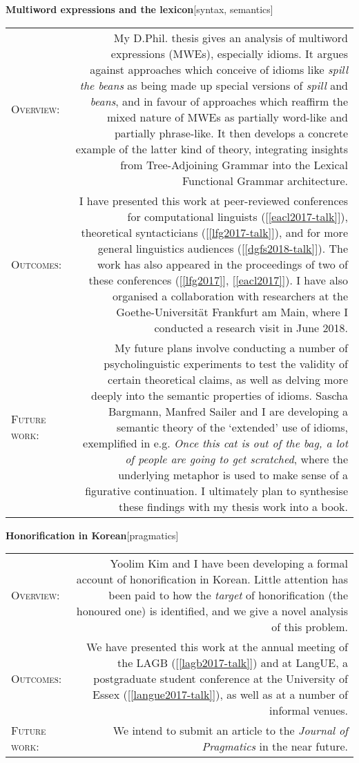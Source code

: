 \documentclass[11pt,a4paper,twoside]{article}
\makeatletter
\newlength{\rulelength}%
\newcommand{\REx}[2]{%
\vspace*{0.1\baselineskip}%
{\large\textbf{#1}\hfill\textnormal{[#2]}}%
\vspace*{0.5\baselineskip}%
}
\newenvironment{cvsection}{%
  \setlength{\extrarowheight}{0.70ex}
  \begin{longtable}[l]{@{} L R @{}}
}{%
  \end{longtable}
}
\newcommand{\sref}[1]{[\ref{#1}]}
\newcommand{\subhead}[1]{%
\textsc{#1}:%
}
\makeatother
\begin{document}
\REx{Multiword expressions and the lexicon}{syntax, semantics}
\begin{cvsection}
  \subhead{Overview} &%
  My D.Phil. thesis gives an analysis of multiword expressions (MWEs), especially idioms. It argues against approaches which conceive of idioms like \emph{spill the beans} as being made up special versions of \emph{spill} and \emph{beans}, and in favour of approaches which reaffirm the mixed nature of MWEs as partially word-like and partially phrase-like. It then develops a concrete example of the latter kind of theory, integrating insights from Tree-Adjoining Grammar into the Lexical Functional Grammar architecture.%
\\
  \subhead{Outcomes} &%
  I have presented this work at peer-reviewed conferences for computational linguists (\sref{eacl2017-talk}), theoretical syntacticians (\sref{lfg2017-talk}), and for more general linguistics audiences (\sref{dgfs2018-talk}). The work has also appeared in the proceedings of two of these conferences (\sref{lfg2017}, \sref{eacl2017}).
  I have also organised a collaboration with researchers at the Goethe-Universit\"{a}t Frankfurt am Main, where I conducted a research visit in June 2018.
\\
  \subhead{Future work} &%
  My future plans involve conducting a number of psycholinguistic experiments to test the validity of certain theoretical claims, as well as delving more deeply into the semantic properties of idioms. Sascha Bargmann, Manfred Sailer and I are developing a semantic theory of the `extended' use of idioms, exemplified in e.g. \textit{Once this cat is out of the bag, a lot of people are going to get scratched}, where the underlying metaphor is used to make sense of a figurative continuation. I ultimately plan to synthesise these findings with my thesis work into a book.
\end{cvsection}

\REx{Honorification in Korean}{pragmatics}
\begin{cvsection}
  \subhead{Overview} &%
  Yoolim Kim and I have been developing a formal account of honorification in Korean. Little attention has been paid to how the \emph{target} of honorification (the honoured one) is identified, and we give a novel analysis of this problem.%
\\
  \subhead{Outcomes} &%
  We have presented this work at the annual meeting of the LAGB (\sref{lagb2017-talk}) and at LangUE, a postgraduate student conference at the University of Essex (\sref{langue2017-talk}), as well as at a number of informal venues.%
\\
  \subhead{Future work} &%
  We intend to submit an article to the \textit{Journal of Pragmatics} in the near future.
\end{cvsection}
\end{document}
